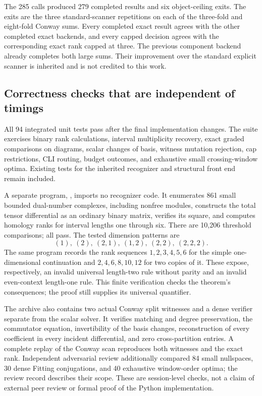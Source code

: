 The 285 calls produced 279 completed results and six object-ceiling exits.
The exits are the three standard-scanner repetitions on each of the
three-fold and eight-fold Conway sums. Every completed exact result agrees
with the other completed exact backends, and every capped decision agrees
with the corresponding exact rank capped at three. The previous component
backend already completes both large sums. Their improvement over the
standard explicit scanner is inherited and is not credited to this work.

\subsection{Correctness checks that are independent of timings}
All 94 integrated unit tests pass after the final implementation changes.
The suite exercises binary rank calculations, interval multiplicity recovery,
exact graded comparisons on diagrams, scalar changes of basis, witness
mutation rejection, cap restrictions, CLI routing, budget outcomes, and
exhaustive small crossing-window optima. Existing tests for the inherited
recognizer and structural front end remain included.

A separate program, , imports no
recognizer code. It enumerates 861 small bounded dual-number complexes,
including nonfree modules, constructs the total tensor differential as an
ordinary binary matrix, verifies its square, and computes homology ranks for
interval lengths one through six. There are 10,206 threshold comparisons;
all pass. The tested dimension patterns are
\[
 (1),\ (2),\ (2,1),\ (1,2),\ (2,2),\ (2,2,2).
\]
The same program records the rank sequences $1,2,3,4,5,6$ for the simple
one-dimensional continuation and $2,4,6,8,10,12$ for two copies of it. These
expose, respectively, an invalid universal length-two rule without parity
and an invalid even-context length-one rule. This finite verification
checks the theorem's consequences; the proof still supplies its universal
quantifier.

The archive also contains two actual Conway split witnesses and a dense
verifier separate from the scalar solver. It verifies matching and degree
preservation, the commutator equation, invertibility of the basis changes,
reconstruction of every coefficient in every incident differential, and
zero cross-partition entries. A complete replay of the Conway scan reproduces
both witnesses and the exact rank. Independent adversarial review additionally
compared 84 small nullspaces, 30 dense Fitting conjugations, and 40 exhaustive
window-order optima; the review record describes their scope. These are
session-level checks, not a claim of external peer review or formal proof
of the Python implementation.

